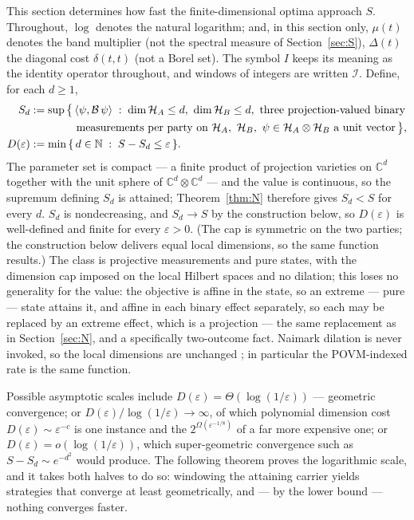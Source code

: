\documentclass[11pt]{article}
\theoremstyle{remark}
\newcommand{\B}{\mathcal{B}}
\newcommand{\eps}{\varepsilon}
\begin{document}
This section determines how fast the finite-dimensional optima approach
$S$. Throughout, $\log$ denotes the natural logarithm; and, in this
section only, $\mu(t)$ denotes the band multiplier (not the spectral
measure of Section~\ref{sec:S}), $\Delta(t)$ the diagonal cost
$\delta(t,t)$ (not a
Borel set). The symbol $I$ keeps its meaning as the identity
operator throughout, and windows of integers are written $\mathcal{I}$.
Define, for each
$d\ge1$,
\begin{align*}
S_d &:= \sup\,\bigl\{\,\langle\psi,\B\,\psi\rangle \;:\;
\dim\mathcal{H}_A\le d,\ \dim\mathcal{H}_B\le d,\ \text{three
projection-valued binary}\\
&\hphantom{{}:={}\sup\,\bigl\{\,}\text{measurements per party on }
\mathcal{H}_A,\ \mathcal{H}_B,\ \psi\in\mathcal{H}_A\otimes\mathcal{H}_B
\text{ a unit vector}\,\bigr\},\\
D(\eps) &:= \min\,\{\, d\in\mathbb{N} \;:\; S-S_d\le\eps \,\}.
\end{align*}
The parameter set is compact --- a finite product of projection varieties
on $\mathbb{C}^d$ together with the unit sphere of
$\mathbb{C}^d\otimes\mathbb{C}^d$ --- and the value is continuous, so the
supremum defining $S_d$ is attained; Theorem~\ref{thm:N} therefore gives
$S_d<S$ for every $d$. $S_d$ is nondecreasing, and $S_d\to S$ by the
construction below, so $D(\eps)$ is well-defined and finite for every
$\eps>0$. (The cap is symmetric on the two parties; the construction
below delivers equal local dimensions, so the same function results.)
The class is projective measurements and pure states, with the dimension
cap imposed on the local Hilbert spaces and no dilation; this loses no generality for the
value: the objective is affine in the state, so an extreme --- pure ---
state attains it, and affine in each binary effect separately, so each
may be replaced by an extreme effect, which is a projection --- the same
replacement as in Section~\ref{sec:N}, and a specifically two-outcome
fact. Naimark dilation is never invoked, so the local dimensions are
unchanged \cite{DGS26}; in particular the POVM-indexed rate is the same
function.

Possible asymptotic scales include $D(\eps)=\Theta(\log(1/\eps))$ ---
geometric convergence; or $D(\eps)/\log(1/\eps)\to\infty$, of which
polynomial dimension cost $D(\eps)\sim\eps^{-c}$ is one instance and the
$2^{\Omega(\eps^{-1/8})}$ of \cite{Coladangelo} a far more expensive one;
or $D(\eps)=o(\log(1/\eps))$, which super-geometric convergence such as
$S-S_d\sim e^{-d^2}$ would produce. The following theorem proves the logarithmic scale, and it takes both halves to do
so: windowing the attaining carrier yields strategies that converge at
least geometrically, and
--- by the lower bound --- nothing converges faster.
\end{document}
